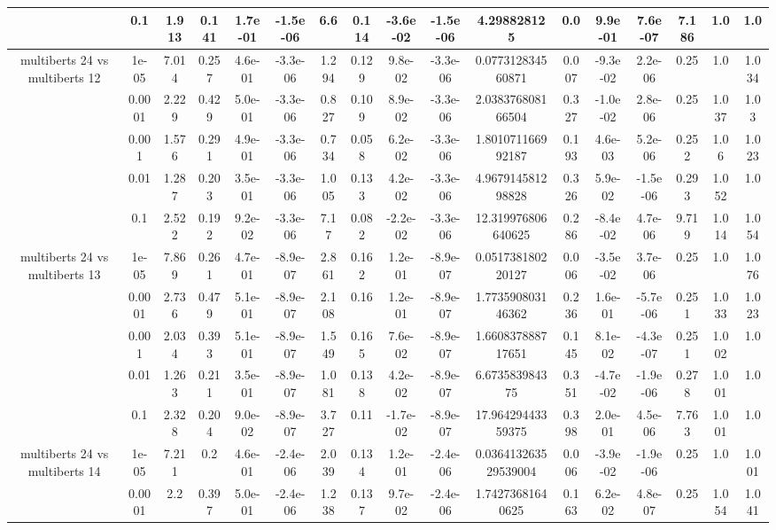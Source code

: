 \begin{tabular}{|c|c|c|c|c|c|c|c|c|c|c|c|c|c|c|c|c|}
 & 0.1 & 1.913 & 0.141 & 1.7e-01 & -1.5e-06 & 6.6 & 0.114 & -3.6e-02 & -1.5e-06 & 4.298828125 & 0.0 & 9.9e-01 & 7.6e-07 & 7.186 & 1.0 & 1.0 \\
\hline
\multirow{5}{*}{multiberts 24 vs multiberts 12} & 1e-05 & 7.014 & 0.257 & 4.6e-01 & -3.3e-06 & 1.294 & 0.129 & 9.8e-02 & -3.3e-06 & 0.077312834560871 & 0.007 & -9.3e-02 & 2.2e-06 & 0.25 & 1.0 & 1.034 \\
 & 0.0001 & 2.229 & 0.429 & 5.0e-01 & -3.3e-06 & 0.827 & 0.109 & 8.9e-02 & -3.3e-06 & 2.038376808166504 & 0.327 & -1.0e-02 & 2.8e-06 & 0.25 & 1.037 & 1.03 \\
 & 0.001 & 1.576 & 0.291 & 4.9e-01 & -3.3e-06 & 0.734 & 0.058 & 6.2e-02 & -3.3e-06 & 1.801071166992187 & 0.193 & 4.6e-03 & 5.2e-06 & 0.252 & 1.06 & 1.023 \\
 & 0.01 & 1.287 & 0.203 & 3.5e-01 & -3.3e-06 & 1.005 & 0.133 & 4.2e-02 & -3.3e-06 & 4.967914581298828 & 0.326 & 5.9e-02 & -1.5e-06 & 0.293 & 1.052 & 1.0 \\
 & 0.1 & 2.522 & 0.192 & 9.2e-02 & -3.3e-06 & 7.17 & 0.082 & -2.2e-02 & -3.3e-06 & 12.319976806640625 & 0.286 & -8.4e-02 & 4.7e-06 & 9.719 & 1.014 & 1.054 \\
\hline
\multirow{5}{*}{multiberts 24 vs multiberts 13} & 1e-05 & 7.869 & 0.261 & 4.7e-01 & -8.9e-07 & 2.861 & 0.162 & 1.2e-01 & -8.9e-07 & 0.051738180220127 & 0.006 & -3.5e-02 & 3.7e-06 & 0.25 & 1.0 & 1.076 \\
 & 0.0001 & 2.736 & 0.479 & 5.1e-01 & -8.9e-07 & 2.108 & 0.16 & 1.2e-01 & -8.9e-07 & 1.773590803146362 & 0.236 & 1.6e-01 & -5.7e-06 & 0.251 & 1.033 & 1.023 \\
 & 0.001 & 2.034 & 0.393 & 5.1e-01 & -8.9e-07 & 1.549 & 0.165 & 7.6e-02 & -8.9e-07 & 1.660837888717651 & 0.145 & 8.1e-02 & -4.3e-07 & 0.251 & 1.002 & 1.0 \\
 & 0.01 & 1.263 & 0.211 & 3.5e-01 & -8.9e-07 & 1.081 & 0.138 & 4.2e-02 & -8.9e-07 & 6.673583984375 & 0.351 & -4.7e-02 & -1.9e-06 & 0.278 & 1.001 & 1.0 \\
 & 0.1 & 2.328 & 0.204 & 9.0e-02 & -8.9e-07 & 3.727 & 0.11 & -1.7e-02 & -8.9e-07 & 17.96429443359375 & 0.398 & 2.0e-01 & 4.5e-06 & 7.763 & 1.001 & 1.0 \\
\hline
\multirow{5}{*}{multiberts 24 vs multiberts 14} & 1e-05 & 7.211 & 0.2 & 4.6e-01 & -2.4e-06 & 2.039 & 0.134 & 1.2e-01 & -2.4e-06 & 0.036413263529539004 & 0.006 & -3.9e-02 & -1.9e-06 & 0.25 & 1.0 & 1.001 \\
 & 0.0001 & 2.2 & 0.397 & 5.0e-01 & -2.4e-06 & 1.238 & 0.137 & 9.7e-02 & -2.4e-06 & 1.74273681640625 & 0.163 & 6.2e-02 & 4.8e-07 & 0.25 & 1.054 & 1.041 \\

\end{tabular}
